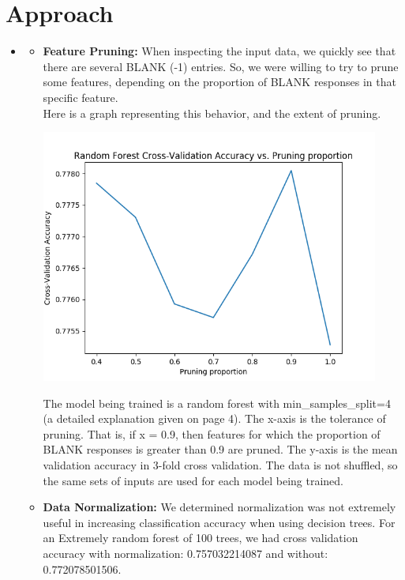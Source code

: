 \pagebreak

\section{Approach}
\medskip
\begin{itemize}

    \item {}
    \begin{itemize}
    \item \textbf{Feature Pruning:} When inspecting the input data, we quickly
    see that there are several BLANK (-1) entries. So, we were willing to
    try to prune some features, depending on the proportion of BLANK responses
    in that specific feature. \\

    Here is a graph representing this behavior, and the extent of pruning.

    \includegraphics[width=30em]{figure_1.png}

    The model being trained is a random forest with min_samples_split=4 (a
    detailed explanation given on page 4). The x-axis is the
    tolerance of pruning. That is, if x = 0.9, then features for which the
    proportion of BLANK responses is greater than 0.9 are pruned. The y-axis
    is the mean validation accuracy in 3-fold cross validation. The data is
    not shuffled, so the same sets of inputs are used for each model being
    trained.\\


    \item \textbf{Data Normalization:}
    We determined normalization was not extremely useful in increasing
    classification accuracy when using decision trees.
    For an Extremely random forest of 100 trees, we
    had cross validation accuracy with normalization: 0.757032214087
    and without: 0.772078501506.


\end{itemize}
\end{itemize}
